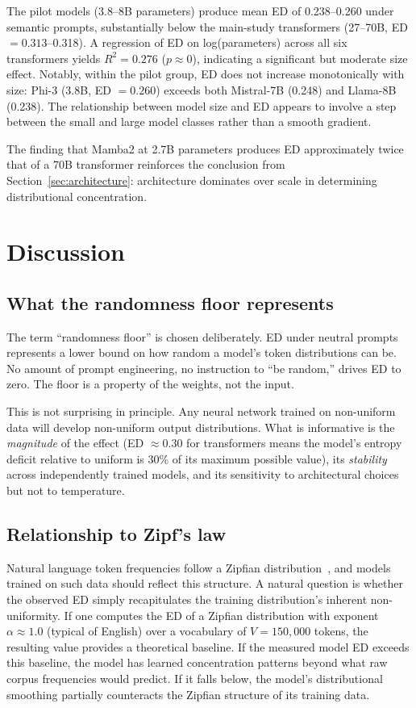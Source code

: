 \documentclass{article}
\begin{document}
The pilot models (3.8--8B parameters) produce mean ED of 0.238--0.260 under semantic prompts, substantially below the main-study transformers (27--70B, ED $= 0.313$--0.318). A regression of ED on log(parameters) across all six transformers yields $R^2 = 0.276$ ($p \approx 0$), indicating a significant but moderate size effect. Notably, within the pilot group, ED does not increase monotonically with size: Phi-3 (3.8B, ED $= 0.260$) exceeds both Mistral-7B (0.248) and Llama-8B (0.238). The relationship between model size and ED appears to involve a step between the small and large model classes rather than a smooth gradient.

The finding that Mamba2 at 2.7B parameters produces ED approximately twice that of a 70B transformer reinforces the conclusion from Section~\ref{sec:architecture}: architecture dominates over scale in determining distributional concentration.

\section{Discussion}
\label{sec:discussion}

\subsection{What the randomness floor represents}

The term ``randomness floor'' is chosen deliberately. ED under neutral prompts represents a lower bound on how random a model's token distributions can be. No amount of prompt engineering, no instruction to ``be random,'' drives ED to zero. The floor is a property of the weights, not the input.

This is not surprising in principle. Any neural network trained on non-uniform data will develop non-uniform output distributions. What is informative is the \emph{magnitude} of the effect (ED $\approx 0.30$ for transformers means the model's entropy deficit relative to uniform is 30\% of its maximum possible value), its \emph{stability} across independently trained models, and its sensitivity to architectural choices but not to temperature.

\subsection{Relationship to Zipf's law}

Natural language token frequencies follow a Zipfian distribution~\citep{zipf1949human, piantadosi2014zipf}, and models trained on such data should reflect this structure. A natural question is whether the observed ED simply recapitulates the training distribution's inherent non-uniformity. If one computes the ED of a Zipfian distribution with exponent $\alpha \approx 1.0$ (typical of English) over a vocabulary of $V = 150{,}000$ tokens, the resulting value provides a theoretical baseline. If the measured model ED exceeds this baseline, the model has learned concentration patterns beyond what raw corpus frequencies would predict. If it falls below, the model's distributional smoothing partially counteracts the Zipfian structure of its training data.
\end{document}
